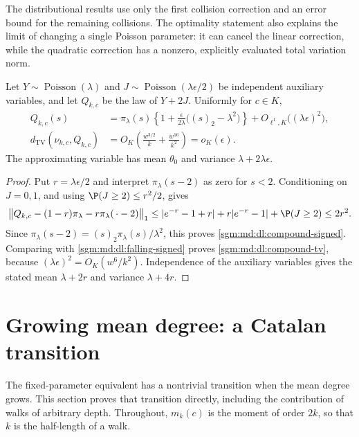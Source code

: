 \documentclass[11pt,letterpaper]{article}
\theoremstyle{remark}\newtheorem{remark}[theorem]{Remark}
\newcommand{\Poi}{\operatorname{Poisson}}\newcommand{\Bin}{\operatorname{Bin}}
\newcommand{\fall}[2]{(#1)_{#2}}\newcommand{\rise}[2]{#1^{\overline{#2}}}
\theoremstyle{definition}\newtheorem{definition}[theorem]{Definition}
\newcommand{\TV}{d_{\mathrm{TV}}}
\begin{document}
The distributional results use only the first collision correction and
an error bound for the remaining collisions.  The optimality statement
also explains the limit of changing a single Poisson parameter: it can
cancel the linear correction, while the quadratic correction has a
nonzero, explicitly evaluated total variation norm.

\begin{corollary}
\label{sgm:md:dl:compound}
Let $Y\sim\Poi(\lambda)$ and $J\sim\Poi(\lambda\epsilon/2)$ be
independent auxiliary variables, and let $Q_{k,c}$ be the law of $Y+2J$.
Uniformly for $c\in K$,
\begin{align}
 Q_{k,c}(s)
 &=\pi_\lambda(s)\left\{1+\frac{\epsilon}{2\lambda}
                \bigl(\fall{s}{2}-\lambda^2\bigr)\right\}
       +O_{\ell^1,K}\bigl((\lambda\epsilon)^2\bigr),
       \label{sgm:md:dl:compound-signed}\\
 \TV(\nu_{k,c},Q_{k,c})
 &=O_K\left(\frac{w^{3/2}}k+\frac{w^{16}}{k^2}\right)
   =o_K(\epsilon).\label{sgm:md:dl:compound-tv}
\end{align}
The approximating variable has mean $\theta_0$ and variance
$\lambda+2\lambda\epsilon$.
\end{corollary}

\begin{proof}
Put $r=\lambda\epsilon/2$ and interpret $\pi_\lambda(s-2)$ as zero
for $s<2$.  Conditioning on $J=0,1$, and using
$\P(J\ge2)\le r^2/2$, gives
\[
 \bigl\|Q_{k,c}-(1-r)\pi_\lambda-r\pi_\lambda(\,\cdot-2)\bigr\|_1
 \le |e^{-r}-1+r|+r|e^{-r}-1|+\P(J\ge2)\le2r^2.
\]
Since $\pi_\lambda(s-2)=\fall{s}{2}\pi_\lambda(s)/\lambda^2$,
this proves \eqref{sgm:md:dl:compound-signed}.  Comparing with
\eqref{sgm:md:dl:falling-signed} proves \eqref{sgm:md:dl:compound-tv}, because
$(\lambda\epsilon)^2=O_K(w^6/k^2)$.  Independence of the auxiliary
variables gives the stated mean $\lambda+2r$ and variance $\lambda+4r$.
\end{proof}
\clearpage
\section{Growing mean degree: a Catalan transition}\label{sgm:md:gd:section}

The fixed-parameter equivalent has a nontrivial transition when the mean
degree grows.  This section proves that transition directly, including
the contribution of walks of arbitrary depth.  Throughout, $m_k(c)$ is
the moment of order $2k$, so that $k$ is the half-length of a walk.
\end{document}
